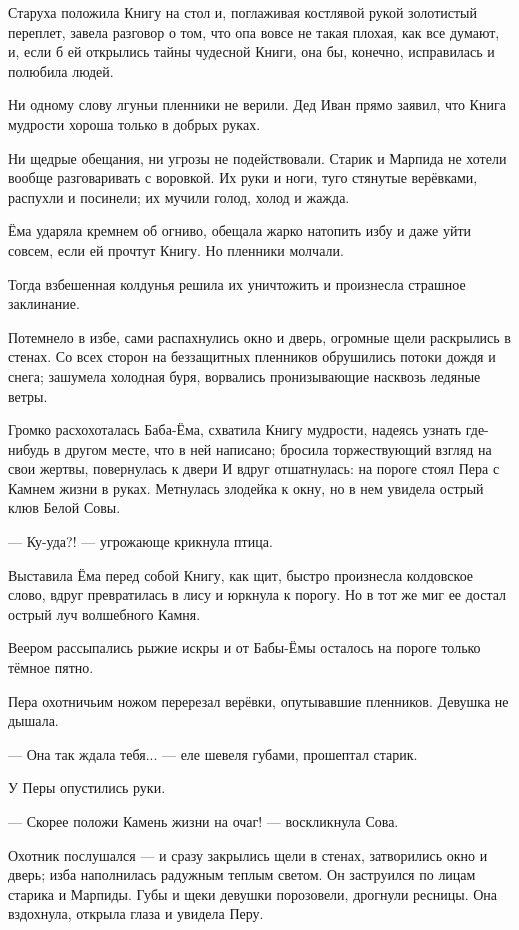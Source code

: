 \documentclass[12pt, a4paper, openany]{book}
\begin{document}
	Старуха положила Книгу на стол и, поглаживая костлявой рукой золотистый переплет, завела разговор о том, что опа вовсе не такая плохая, как все думают, и, если б ей открылись тайны чудесной Книги, она бы, конечно, исправилась и полюбила людей.
	
	Ни одному слову лгуньи пленники не верили. Дед Иван прямо заявил, что Книга мудрости хороша только в добрых руках.
	
	Ни щедрые обещания, ни угрозы не подействовали. Старик и Марпида не хотели вообще разговаривать с воровкой. Их руки и ноги, туго стянутые верёвками, распухли и посинели; их мучили голод, холод и жажда.
	
	Ёма ударяла кремнем об огниво, обещала жарко натопить избу и даже уйти совсем, если ей прочтут Книгу. Но пленники молчали.
	
	Тогда взбешенная колдунья решила их уничтожить и произнесла страшное заклинание.
	
	Потемнело в избе, сами распахнулись окно и дверь, огромные щели раскрылись в стенах. Со всех сторон на беззащитных пленников обрушились потоки дождя и снега; зашумела холодная буря, ворвались пронизывающие насквозь ледяные ветры.
	
	Громко расхохоталась Баба-Ёма, схватила Книгу мудрости, надеясь узнать где-нибудь в другом месте, что в ней написано; бросила торжествующий взгляд на свои жертвы, повернулась к двери И вдруг отшатнулась: на пороге стоял Пера с Камнем жизни в руках. Метнулась злодейка к окну, но в нем увидела острый клюв Белой Совы.
	
	— Ку-уда?! — угрожающе крикнула птица.
	
	Выставила Ёма перед собой Книгу, как щит, быстро произнесла колдовское слово, вдруг превратилась в лису и юркнула к порогу. Но в тот же миг ее достал острый луч волшебного Камня.
	
	Веером рассыпались рыжие искры и от Бабы-Ёмы осталось на пороге только тёмное пятно.
	
	Пера охотничьим ножом перерезал верёвки, опутывавшие пленников. Девушка не дышала.
	
	— Она так ждала тебя... — еле шевеля губами, прошептал старик.
	
	У Перы опустились руки.
	
	— Скорее положи Камень жизни на очаг! — воскликнула Сова.
	
	Охотник послушался — и сразу закрылись щели в стенах, затворились окно и дверь; изба наполнилась радужным теплым светом. Он заструился по лицам старика и Марпиды. Губы и щеки девушки порозовели, дрогнули ресницы. Она вздохнула, открыла глаза и увидела Перу.
	
\end{document}
